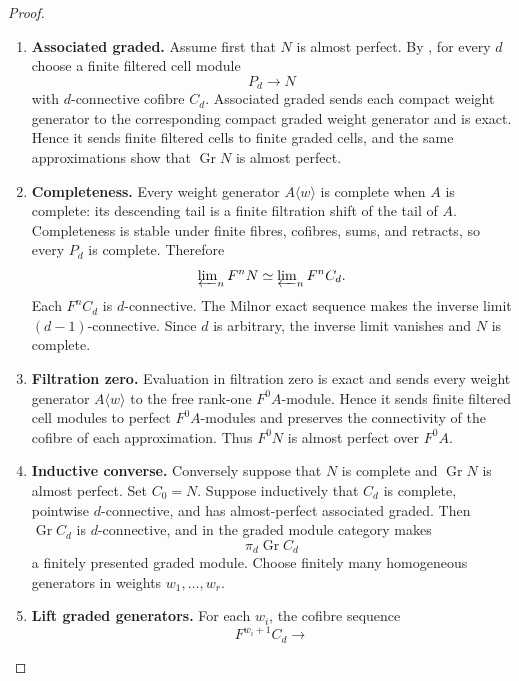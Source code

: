 \begin{proof}
\leavevmode
\begin{enumerate}[label=\textup{(\arabic*)}]
    \item \textbf{Associated graded.}
    Assume first that \(N\) is almost perfect. By
    , for every \(d\) choose a finite
    filtered cell module
    \[
        P_d\longrightarrow N
    \]
    with \(d\)-connective cofibre \(C_d\). Associated graded sends each compact
    weight generator to the corresponding compact graded weight generator and is
    exact. Hence it sends finite filtered cells to finite graded cells, and the
    same approximations show that \(\operatorname{Gr}N\) is almost perfect.
    \item \textbf{Completeness.}
    Every weight generator \(A\langle w\rangle\) is complete when \(A\) is
    complete: its descending tail is a finite filtration shift of the tail of
    \(A\). Completeness is stable under finite fibres, cofibres, sums, and
    retracts, so every \(P_d\) is complete. Therefore
    \[
        \varprojlim\nolimits_nF^nN
        \simeq
        \varprojlim\nolimits_nF^nC_d.
    \]
    Each \(F^nC_d\) is \(d\)-connective. The Milnor exact sequence makes the
    inverse limit \((d-1)\)-connective. Since \(d\) is arbitrary, the inverse
    limit vanishes and \(N\) is complete.
    \item \textbf{Filtration zero.}
    Evaluation in filtration zero is exact and sends every weight generator
    \(A\langle w\rangle\) to the free rank-one \(F^0A\)-module. Hence it sends
    finite filtered cell modules to perfect \(F^0A\)-modules and preserves the
    connectivity of the cofibre of each approximation. Thus \(F^0N\) is almost
    perfect over \(F^0A\).
    \item \textbf{Inductive converse.}
    Conversely suppose that \(N\) is complete and \(\operatorname{Gr}N\) is
    almost perfect. Set \(C_0=N\). Suppose inductively that \(C_d\) is complete,
    pointwise \(d\)-connective, and has almost-perfect associated graded. Then
    \(\operatorname{Gr}C_d\) is \(d\)-connective, and
     in the graded module
    category makes
    \[
        \pi_d\operatorname{Gr}C_d
    \]
    a finitely presented graded module. Choose finitely many homogeneous
    generators in weights \(w_1,\ldots,w_r\).
    \item \textbf{Lift graded generators.}
    For each \(w_i\), the cofibre sequence
    \[
        F^{w_i+1}C_d
        \longrightarrow
\]
\end{enumerate}
\end{proof}
